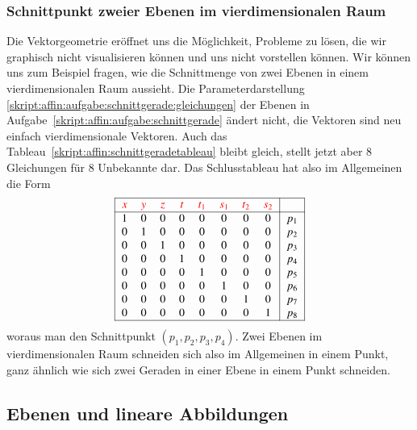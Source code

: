 \subsubsection{Schnittpunkt zweier Ebenen im vierdimensionalen Raum}
Die Vektorgeometrie eröffnet uns die Möglichkeit, Probleme zu lösen,
die wir graphisch nicht visualisieren können und uns nicht vorstellen
können.
Wir können uns zum Beispiel fragen, wie die Schnittmenge von zwei Ebenen
in einem vierdimensionalen Raum aussieht.
Die Parameterdarstellung
\eqref{skript:affin:aufgabe:schnittgerade:gleichungen}
der Ebenen
in Aufgabe~\ref{skript:affin:aufgabe:schnittgerade}
ändert nicht, die Vektoren sind neu
einfach vierdimensionale Vektoren.
Auch das Tableau~\eqref{skript:affin:schnittgeradetableau} bleibt gleich,
stellt jetzt aber 8 Gleichungen für 8 Unbekannte dar.
Das Schlusstableau hat also im Allgemeinen die Form
\[
\begin{tabular}{|
>{$}c<{$}
>{$}c<{$}
>{$}c<{$}
>{$}c<{$}
>{$}c<{$}
>{$}c<{$}
>{$}c<{$}
>{$}c<{$}|
>{$}c<{$}|}
\hline
\color{red}x&
\color{red}y&
\color{red}z&
\color{red}t&
\color{red}t_1&
\color{red}s_1&
\color{red}t_2&
\color{red}s_2&
\\
\hline
1&0&0&0&0&0&0&0&p_1\\
0&1&0&0&0&0&0&0&p_2\\
0&0&1&0&0&0&0&0&p_3\\
0&0&0&1&0&0&0&0&p_4\\
0&0&0&0&1&0&0&0&p_5\\
0&0&0&0&0&1&0&0&p_6\\
0&0&0&0&0&0&1&0&p_7\\
0&0&0&0&0&0&0&1&p_8\\
\hline
\end{tabular}
\]
woraus man den Schnittpunkt  $(p_1,p_2,p_3,p_4)$.
Zwei Ebenen im vierdimensionalen Raum schneiden sich also im Allgemeinen
in einem Punkt, ganz ähnlich wie sich zwei Geraden in einer Ebene in
einem Punkt schneiden.

\subsection{Ebenen und lineare Abbildungen}
